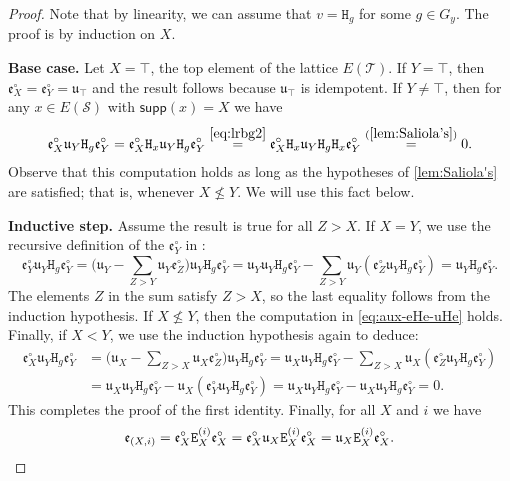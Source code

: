 \documentclass[11pt, oneside, reqno]{amsart}
\theoremstyle{definition}
\numberwithin{equation}{section}
\def \SS{{\mathcal{S}}}
\def \TT{{\mathcal{T}}}
\def \uu{{\mathfrak{u}}}
\def \ee{{\mathfrak{e}}}
\def \supp{\mathsf{supp}}
\newcommand{\B}[1]{\mathtt{#1}} 			%
\begin{document}
\begin{proof}
Note that by linearity, we can assume that $v = \B{H}_g$ for some $g \in G_y$.
The proof is by induction on $X$.

\medskip

\noindent\textbf{Base case.}
Let $X = \top$, the top element of the lattice $E(\TT)$.
If $Y = \top$, then $\ee^\circ_X = \ee^\circ_Y = \uu_\top$ and the result follows because $\uu_\top$ is idempotent.
If $Y \neq \top$, then for any $x \in E(\SS)$ with $\supp(x) = X$ we have
\begin{equation}\label{eq:aux-eHe-uHe}
    \ee^\circ_X \uu_Y \B{H}_g \ee^\circ_Y                       =
    \ee^\circ_X \B{H}_x \uu_Y \B{H}_g \ee^\circ_Y               \overset{\cref{eq:lrbg2}}{=}
    \ee^\circ_X \B{H}_x \uu_Y \B{H}_g \B{H}_x \ee^\circ_Y       \overset{\rm (\cref{lem:Saliola's})}{=}
    0 .
\end{equation}
Observe that this computation holds as long as the hypotheses of \cref{lem:Saliola's} are satisfied; that is, whenever $X \not\leq Y$. We will use this fact below.

\medskip

\noindent\textbf{Inductive step.}
Assume the result is true for all $Z > X$.
If $X = Y$, we use the recursive definition of the $\ee^\circ_Y$ in :
\[
      \ee^\circ_Y \uu_Y \B{H}_g \ee^\circ_Y
    = \Big( \uu_Y - \sum_{Z > Y} \uu_Y \ee^\circ_Z \Big) \uu_Y \B{H}_g \ee^\circ_Y
    = \uu_Y \uu_Y \B{H}_g \ee^\circ_Y - \sum_{Z > Y} \uu_Y (\ee^\circ_Z \uu_Y \B{H}_g \ee^\circ_Y)
    = \uu_Y \B{H}_g \ee^\circ_Y.
\]
The elements $Z$ in the sum satisfy $Z > X$, so the last equality follows from the induction hypothesis.
If $X \not\leq Y$, then the computation in \cref{eq:aux-eHe-uHe} holds.
Finally, if $X < Y$, we use the induction hypothesis again to deduce:
\begin{align*}
          \ee^\circ_X \uu_Y \B{H}_g \ee^\circ_Y 
    & = \Big( \uu_X - \sum_{Z > X} \uu_X \ee^\circ_Z \Big) \uu_Y \B{H}_g \ee^\circ_Y
    = \uu_X \uu_Y \B{H}_g \ee^\circ_Y - \sum_{Z > X} \uu_X (\ee^\circ_Z \uu_Y \B{H}_g \ee^\circ_Y)\\
    &
    = \uu_X \uu_Y \B{H}_g \ee^\circ_Y - \uu_X (\ee^\circ_Y \uu_Y \B{H}_g \ee^\circ_Y)
    = \uu_X \uu_Y \B{H}_g \ee^\circ_Y - \uu_X \uu_Y \B{H}_g \ee^\circ_Y
    = 0.
\end{align*}
This completes the proof of the first identity.
Finally, for all $X$ and $i$ we have
\[
    \ee_{(X,i)} = 
    \ee^\circ_X \B{E}^{(i)}_X \ee^\circ_X = 
    \ee^\circ_X \uu_X \B{E}^{(i)}_X \ee^\circ_X = 
    \uu_X \B{E}^{(i)}_X \ee^\circ_X. \qedhere
\]
\end{proof}
\end{document}
